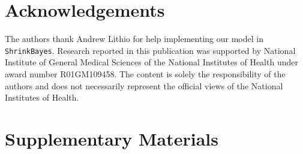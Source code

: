\documentclass[useAMS,usenatbib,referee]{biom}
\begin{document}
\backmatter %



\section*{Acknowledgements}


The authors thank Andrew Lithio for help implementing our model in {\tt ShrinkBayes}. Research reported in this publication was supported by National Institute of General Medical Sciences of the National Institutes of Health under award number R01GM109458. The content is solely the responsibility of the authors and does not necessarily represent the official views of the National Institutes of Health.


\section*{Supplementary Materials}





\appendix


\section{}

\label{lastpage}
\end{document}
